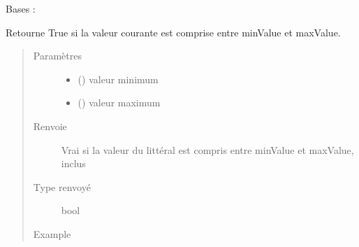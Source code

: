 \documentclass[letterpaper,10pt,french]{sphinxmanual}
\begin{document}
\begin{fulllineitems}
\label{\detokenize{litteral:litteral.Litteral}}
Bases : 

\begin{fulllineitems}
\label{\detokenize{litteral:litteral.Litteral.isBetween}}
Retourne True si la valeur courante est comprise entre minValue et maxValue.
\begin{quote}\begin{description}
\item[{Paramètres}] \leavevmode\begin{itemize}
\item {} 
 () \textendash{} valeur minimum

\item {} 
 () \textendash{} valeur maximum

\end{itemize}

\item[{Renvoie}] \leavevmode
Vrai si la valeur du littéral est compris entre minValue et maxValue, inclus

\item[{Type renvoyé}] \leavevmode
bool

\item[{Example}] \leavevmode
\begin{sphinxVerbatim}[commandchars=\\\{\}]
\end{sphinxVerbatim}


\end{description}
\end{quote}
\end{fulllineitems}
\end{fulllineitems}
\end{document}
